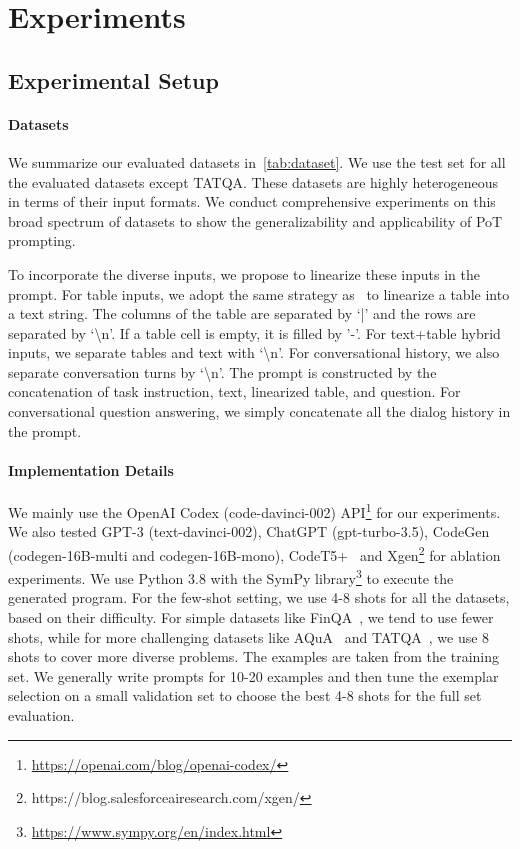 \section{Experiments}

\subsection{Experimental Setup}
\paragraph{Datasets}
We summarize our evaluated datasets in~\autoref{tab:dataset}. We use the test set for all the evaluated datasets except TATQA. These datasets are highly heterogeneous in terms of their input formats. We conduct comprehensive experiments on this broad spectrum of datasets to show the generalizability and applicability of PoT prompting.

To incorporate the diverse inputs, we propose to linearize these inputs in the prompt. For table inputs, we adopt the same strategy as~\cite{chen2022large} to linearize a table into a text string. The columns of the table are separated by `|' and the rows are separated by `\textbackslash n'. If a table cell is empty, it is filled by '-'. For text+table hybrid inputs, we separate tables and text with `\textbackslash n'. For conversational history, we also separate conversation turns by `\textbackslash n'. The prompt is constructed by the concatenation of task instruction, text, linearized table, and question. For conversational question answering, we simply concatenate all the dialog history in the prompt.

\paragraph{Implementation Details} We mainly use the OpenAI Codex (code-davinci-002) API\footnote{\url{https://openai.com/blog/openai-codex/}} for our experiments. We also tested GPT-3 (text-davinci-002), ChatGPT (gpt-turbo-3.5), CodeGen~\citep{nijkamp2022codegen} (codegen-16B-multi and codegen-16B-mono), CodeT5+~\citep{wang2023codet5+} and Xgen\footnote{https://blog.salesforceairesearch.com/xgen/} for ablation experiments. We use Python 3.8 with the SymPy library\footnote{\url{https://www.sympy.org/en/index.html}} to execute the generated program. For the few-shot setting, we use 4-8 shots for all the datasets, based on their difficulty. For simple datasets like FinQA~\citep{chen2021finqa}, we tend to use fewer shots, while for more challenging datasets like AQuA~\citep{ling2017program} and TATQA~\citep{zhu2021tat}, we use 8 shots to cover more diverse problems. The examples are taken from the training set. We generally write prompts for 10-20 examples and then tune the exemplar selection on a small validation set to choose the best 4-8 shots for the full set evaluation.

